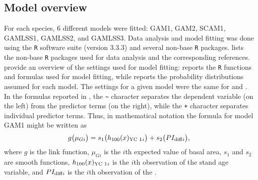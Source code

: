\subsection{Model overview}

For each species, 6 different models were fitted: GAM1, GAM2, SCAM1, GAMLSS1,
GAMLSS2, and GAMLSS3.
Data analysis and model fitting was done using the \texttt{R} software suite (version 3.3.3) \parencite{RCT2017} and several non-base \texttt{R} packages.
 lists the non-base \texttt{R} packages used for data analysis and the corresponding references.
 provide an overview of the settings used for model fitting:   reports the \texttt{R} functions and formulas used for model fitting, while  reports the probability distributions assumed for each model.
The settings for a given model were the same for \Beech{} and \Spruce{}.
In the formulas reported in , the \texttt{\textasciitilde{}} character separates the dependent variable (on the left) from the predictor terms (on the right), while the \texttt{+} character separates individual predictor terms.
Thus, in mathematical notation the formula for model GAM1 might be written as
\begin{equation}
  \label{eq:GAM1FormulaMathematicalNotation}
  g\bigl(\mu_{Gi}\bigr) = s_1\bigl(h_{100}(x)_{\text{YC 1}}{}_i\bigr) + s_2\bigl(PI_{\text{diff}}{}_i\bigr),
\end{equation}
where \(g\) is the link function, \(\mu_{Gi}\) is the \(i\)th expected value of basal area, \(s_1\) and \(s_2\) are smooth functions, \(h_{100}(x)_{\text{YC 1}}{}_i\) is the \(i\)th observation of the stand age variable, and \(PI_{\text{diff}}{}_i\) is the \(i\)th observation of the \ProductivityIndexVariableText{}.
